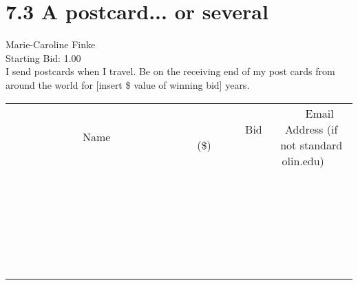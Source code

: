 \documentclass[11pt]{article}
\begin{document}
					\section*{7.3 A postcard... or several}
					Marie-Caroline Finke \\
					Starting Bid: 1.00 \\
					I send postcards when I travel. Be on the receiving end of my post cards from around the world for [insert \$ value of winning bid] years. \\
					[6ex]
					\begin{tabular}{c c c}
						~~~~~~~~~~~~~Name~~~~~~~~~~~~~ & ~~~~~~~~~Bid (\$)~~~~~~~~~ & ~~~Email Address (if not standard olin.edu)~~~ \\
				
 & & \\
\hline
 & & \\
\hline
 & & \\
\hline
 & & \\
\hline
 & & \\
\hline
 & & \\
\hline
 & & \\
\hline
 & & \\
\hline
 & & \\
\hline
 & & \\
\hline
 & & \\
\hline
 & & \\
\hline
 & & \\
\hline
 & & \\
\hline
 & & \\
\hline
 & & \\
\hline
 & & \\
\hline
 & & \\
\hline
 & & \\
\hline
 & & \\
\hline
 & & \\
\hline
 & & \\
\hline
 & & \\
\hline
 & & \\
\hline
 & & \\
\hline
 & & \\
\hline
					\end{tabular}
					\clearpage
				
\end{document}

